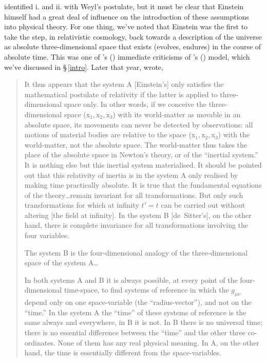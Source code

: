 \documentclass[12 pt]{article}
\def\citeapos#1{\citeauthor{#1}'s (\citeyear{#1})}
\begin{document}
\citet{Robertson1933} identified i. and ii. with Weyl's postulate, but it must be clear that Einstein himself had a great deal of influence on the introduction of these assumptions into physical theory. For one thing, we've noted that Einstein was the first to take the step, in relativistic cosmology, back towards a description of the universe as absolute three-dimensional space that exists (evolves, endures) in the course of absolute time. This was one of \citeapos{deSitter1917a} immediate criticisms of \citeapos{Einstein1917} model, which we've discussed in \S\,\ref{intro}. Later that year, \citet{deSitter1917b} wrote,
\begin{quote}
It thus appears that the system A [Einstein's] only satisfies the mathematical postulate of relativity if the latter is applied to three-dimensional space only. In other words, if we conceive the three-dimensional space ($\mathrm{x}_1,\mathrm{x}_2,\mathrm{x}_3$) with its world-matter as movable in an absolute space, its movements can never be detected by observations: all motions of material bodies are relative to the space ($\mathrm{x}_1,\mathrm{x}_2,\mathrm{x}_3$) with the world-matter, not the absolute space. The world-matter thus takes the place of the absolute space in Newton's theory, or of the ``inertial system.'' It is nothing else but this inertial system materialised. It should be pointed out that this relativity of inertia is in the system A only realised by making time practically absolute. It is true that the fundamental equations of the theory\ldots remain invariant for all transformations. But only such transformations for which at infinity $t'=t$ can be carried out without altering [the field at infinity]. In the system B [de~Sitter's], on the other hand, there is complete invariance for all transformations involving the four variables.
	
The system B is the four-dimensional analogy of the three-dimensional space of the system A\ldots
	
In both systems A and B it is always possible, at every point of the four-dimensional time-space, to find systems of reference in which the $g_{\mu\nu}$ depend only on one space-variable (the ``radius-vector''), and not on the ``time.'' In the system A the ``time'' of these systems of reference is the same always and everywhere, in B it is not. In B there is no universal time; there is no essential difference between the ``time'' and the other three co-ordinates. None of them has any real physical meaning. In A, on the other hand, the time is essentially different from the space-variables.
\end{quote}
\end{document}
